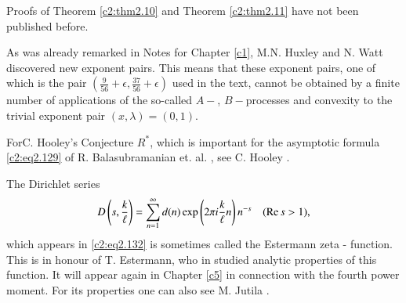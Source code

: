 Proofs of Theorem \ref{c2:thm2.10} and Theorem \ref{c2:thm2.11} have
not been published before.

As was already remarked in Notes for Chapter \ref{c1}, M.N. Huxley and
N. Watt \cite{Huxley and Watt1} discovered new exponent pairs. This means that these
exponent pairs, one of which is the pair $\left( \frac{9}{56} + \epsilon,
\frac{37}{56}+ \epsilon \right)$ used in the text, cannot be obtained
by a finite number of applications of the so-called $A-$,
$B-$processes and convexity to the trivial exponent pair $(x,
\lambda)= (0, 1)$.

For\pageoriginale C. Hooley's Conjecture $R^*$, which is important for
the asymptotic formula \eqref{c2:eq2.129} of R. Balasubramanian
et. al. \cite{Balasubramanian1}, see C. Hooley \cite{Hooley1}.

The Dirichlet series
$$
D\left(s, \frac{k}{\ell}\right) = \sum_{n=1}^\infty d(n) \exp \left(2
\pi i \frac{k}{\ell} n \right) n^{-s} \quad (\operatorname{Re} s > 1),
$$
which appears in \eqref{c2:eq2.132} is sometimes called the Estermann
zeta - function. This is in honour of T. Estermann, who in \cite{Estermann1}
studied analytic properties of this function. It will appear again in
Chapter \ref{c5} in connection with the fourth power moment. For its
properties one can also see M. Jutila \cite{Jutila9}.

